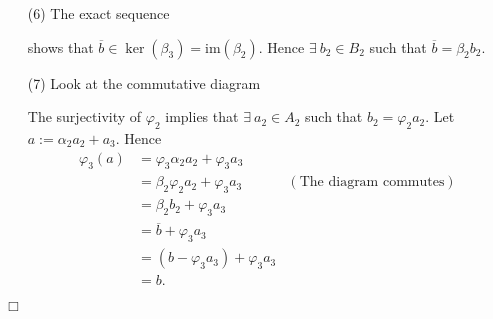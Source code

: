 \documentclass{article}
\begin{document}
\begin{enumerate}
\item[(6)]
  The exact sequence
  \begin{center}
  \end{center}
  shows that $\overline{b} \in \ker(\beta_3) = \mathrm{im}(\beta_2)$.
  Hence $\exists \: b_2 \in B_2$ such that $\overline{b} = \beta_2 b_2$.

\item[(7)]
  Look at the commutative diagram
  \begin{center}
  \end{center}
  The surjectivity of $\varphi_2$ implies that
  $\exists \: a_2 \in A_2$ such that $b_2 = \varphi_2 a_2$.
  Let $a := \alpha_2 a_2 + a_3$.
  Hence
  \begin{align*}
    \varphi_3(a)
    &= \varphi_3\alpha_2 a_2 + \varphi_3 a_3 \\
    &= \beta_2\varphi_2 a_2 + \varphi_3 a_3
      &(\text{The diagram commutes}) \\
    &= \beta_2 b_2 + \varphi_3 a_3 \\
    &= \overline{b} + \varphi_3 a_3 \\
    &= (b - \varphi_3 a_3) + \varphi_3 a_3 \\
    &= b.
  \end{align*}
\end{enumerate}
$\Box$ \\\\



\end{document}
